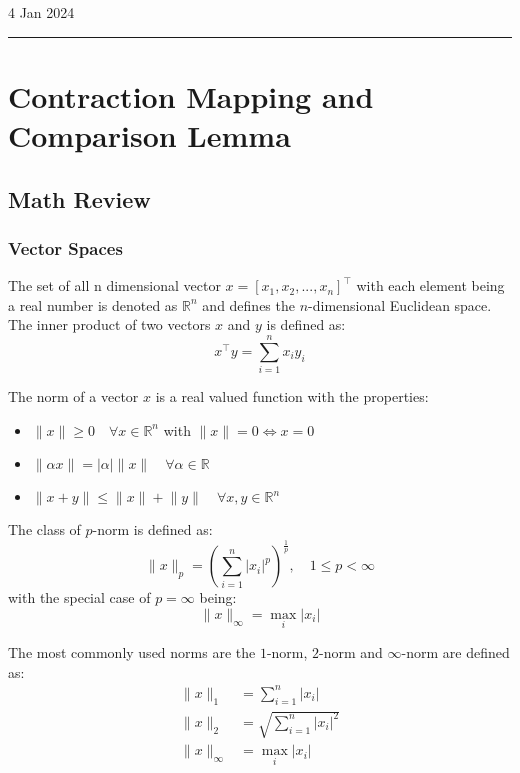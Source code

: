 \hfill\small{4 Jan 2024}
\vspace{0.5em}
\hrule
\vspace{-0.5em}
\section{Contraction Mapping and Comparison Lemma}

\subsection{Math Review}

\subsubsection{Vector Spaces}

The set of all n dimensional vector \(x = [x_1, x_2, ..., x_n]^{\top} \) with each element being 
a real number is denoted as \(\mathbb{R}^n\) and defines the \(n\)-dimensional Euclidean space.
The inner product of two vectors \(x\) and \(y\) is defined as:
\[
    x^{\top} y = \sum\limits_{i=1}^{n} x_i y_i
\]

The norm of a vector \(x\) is a real valued function with the properties:

\begin{itemize}
    \item \(\lVert x \rVert \geq 0 \quad \forall x \in \mathbb{R}^n\) with \(\lVert x \rVert = 0 \iff x = 0\)
    \item \(\lVert \alpha x \rVert = \lvert \alpha \rvert \lVert x \rVert \quad \forall \alpha \in \mathbb{R}\)
    \item \(\lVert x + y \rVert \leq \lVert x \rVert + \lVert y \rVert \quad \forall x, y \in \mathbb{R}^n\)
\end{itemize}

The class of \(p\)-norm is defined as:
\[
    \lVert x \rVert_p = \left( \sum\limits_{i=1}^{n} \lvert x_i \rvert^p \right)^{\frac{1}{p}} 
    , \quad 1 \leq p < \infty 
\]
with the special case of \(p = \infty\) being:
\[
    \lVert x \rVert_{\infty} = \max\limits_{i} \lvert x_i \rvert
\]

The most commonly used norms are the \(1\)-norm, \(2\)-norm and \(\infty\)-norm are defined as:
\[
    \begin{aligned}
        \lVert x \rVert_1 &= \sum\limits_{i=1}^{n} \lvert x_i \rvert \\
        \lVert x \rVert_2 &= \sqrt{\sum\limits_{i=1}^{n} \lvert x_i \rvert^2} \\
        \lVert x \rVert_{\infty} &= \max\limits_{i} \lvert x_i \rvert
    \end{aligned}
\]

